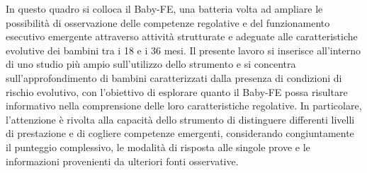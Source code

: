 In questo quadro si colloca il Baby-FE, una batteria volta ad ampliare le possibilità di osservazione delle competenze regolative e del funzionamento esecutivo emergente attraverso attività strutturate e adeguate alle caratteristiche evolutive dei bambini tra i 18 e i 36 mesi. Il presente lavoro si inserisce all'interno di uno studio più ampio sull'utilizzo dello strumento e si concentra sull'approfondimento di bambini caratterizzati dalla presenza di condizioni di rischio evolutivo, con l'obiettivo di esplorare quanto il Baby-FE possa risultare informativo nella comprensione delle loro caratteristiche regolative. In particolare, l'attenzione è rivolta alla capacità dello strumento di distinguere differenti livelli di prestazione e di cogliere competenze emergenti, considerando congiuntamente il punteggio complessivo, le modalità di risposta alle singole prove e le informazioni provenienti da ulteriori fonti osservative.

